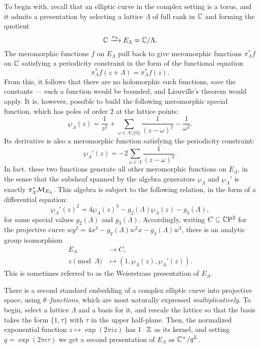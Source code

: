 To begin with, recall that an elliptic curve in the complex setting is a torus, and it admits a presentation by selecting a lattice $\Lambda$ of full rank in $\mathbb{C}$ and forming the quotient \[\mathbb{C} \xrightarrow{\pi_\Lambda} E_\Lambda = \mathbb{C} / \Lambda.\]  The meromorphic functions $f$ on $E_\Lambda$ pull back to give meromorphic functions $\pi_\Lambda^* f$ on $\mathbb{C}$ satisfying a periodicity constraint in the form of the functional equation \[\pi_\Lambda^* f(z + \Lambda) = \pi_\Lambda^* f(z).\]  From this, it follows that there are no holomorphic such functions, save the constants --- such a function would be bounded, and Liouville's theorem would apply.  It is, however, possible to build the following meromorphic special function, which has poles of order $2$ at the lattice points: \[\wp_\Lambda(z) = \frac{1}{z^2} + \sum_{\omega \in \Lambda \setminus \{0\}} \frac{1}{(z - \omega)^2} - \frac{1}{\omega^2}.\]  Its derivative is also a meromorphic function satisfying the periodicity constraint: \[\wp_\Lambda'(z) = -2 \sum_{\omega \in \Lambda} \frac{1}{(z - \omega)^3}.\]  In fact, these two functions generate all other meromorphic functions on $E_\Lambda$, in the sense that the subsheaf spanned by the algebra generators $\wp_\Lambda$ and $\wp_\Lambda'$ is exactly $\pi_\Lambda^* \mathcal{M}_{E_\Lambda}$.  This algebra is subject to the following relation, in the form of a differential equation: \[\wp_\Lambda'(z)^2 = 4 \wp_\Lambda(z)^3 - g_2(\Lambda) \wp_\Lambda(z) - g_3(\Lambda),\] for some special values $g_2(\Lambda)$ and $g_3(\Lambda)$.  Accordingly, writing $C \subseteq \mathbb{C}\mathrm P^2$ for the projective curve $wy^2 = 4x^3 - g_2(\Lambda) w^2 x - g_3(\Lambda) w^3$, there is an analytic group isomorphism
\begin{align*}
E_\Lambda & \to C, \\
z \pmod \Lambda & \mapsto (1, \wp_\Lambda(z), \wp_\Lambda'(z)).
\end{align*}
This is sometimes referred to as the Weierstrass presentation of $E_\Lambda$.

There is a second standard embedding of a complex elliptic curve into projective space, using \textit{$\theta$--functions}, which are most naturally expressed \emph{multiplicatively}.  To begin, select a lattice $\Lambda$ and a basis for it, and rescale the lattice so that the basis takes the form $\{1, \tau\}$ with $\tau$ in the upper half-plane.  Then, the normalized exponential function $z \mapsto \exp(2 \pi i z)$ has $1 \cdot \mathbb Z$ as its kernel, and setting $q = \exp(2 \pi i \tau)$ we get a second presentation of $E_\Lambda$ as $\mathbb{C}^\times / q^{\mathbb Z}$.

